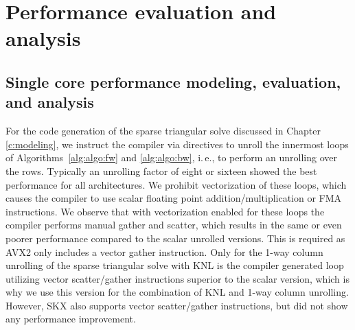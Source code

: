 \chapter{Performance evaluation and analysis}
\label{sec:pa}
\label{sec:performance}

\section{Single core performance modeling, evaluation, and analysis}
\label{sec:performance:singlecore}

For the code generation
of the sparse triangular solve discussed in Chapter \ref{c:modeling}, we instruct
the compiler via directives to unroll the
innermost loops of Algorithms~\ref{alg:algo:fw} and \ref{alg:algo:bw}, i.\,e.,
to perform an unrolling over the rows.
Typically an unrolling factor of eight or sixteen showed the best
performance for all architectures.
%
We prohibit vectorization of these loops, which causes the
compiler to use scalar floating point addition/multiplication or FMA
instructions.
%
We observe that
with vectorization enabled for these loops the compiler
performs manual gather and scatter, which results in the same or even poorer
performance compared to the scalar unrolled versions.
This is required as AVX2 only includes a vector gather instruction.
%
Only for the 1-way column unrolling of the sparse triangular solve
with KNL is the compiler
generated loop utilizing vector scatter/gather instructions superior to
the scalar version, which is why we use this version for the combination of KNL
and 1-way column unrolling.
However, SKX also supports vector scatter/gather instructions, but did not
show any performance improvement.

